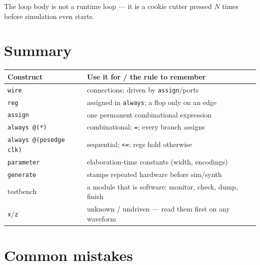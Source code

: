 The loop body is not a runtime loop --- it is a cookie cutter pressed
$N$ times before simulation even starts.

\section{Summary}

\begin{center}
\begin{tabularx}{\textwidth}{l>{\raggedright\arraybackslash}X}
\toprule
\textbf{Construct} & \textbf{Use it for / the rule to remember}\\
\midrule
\texttt{wire} & connections; driven by \texttt{assign}/ports\\
\texttt{reg} & assigned in \texttt{always}; a flop only on an edge\\
\texttt{assign} & one permanent combinational expression\\
\texttt{always @(*)} & combinational; \texttt{=}; every branch assigns\\
\texttt{always @(posedge clk)} & sequential; \texttt{<=}; regs hold
otherwise\\
\texttt{parameter} & elaboration-time constants (width, encodings)\\
\texttt{generate} & stamps repeated hardware before sim/synth\\
testbench & a module that is software: monitor, check, dump, finish\\
\texttt{x}/\texttt{z} & unknown / undriven --- read them first on any
waveform\\
\bottomrule
\end{tabularx}
\end{center}

\section{Common mistakes}\label{sec:cm11}


